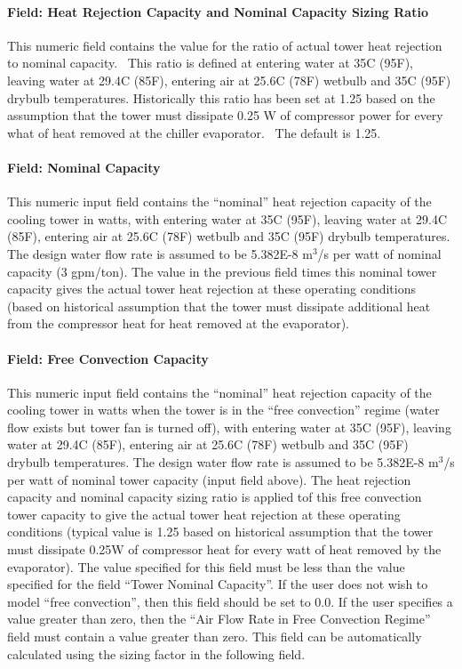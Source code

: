 \paragraph{Field: Heat Rejection Capacity and Nominal Capacity Sizing Ratio}\label{field-heat-rejection-capacity-and-nominal-capacity-sizing-ratio}

This numeric field contains the value for the ratio of actual tower heat rejection to nominal capacity.~ This ratio is defined at entering water at 35C (95F), leaving water at 29.4C (85F), entering air at 25.6C (78F) wetbulb and 35C (95F) drybulb temperatures. Historically this ratio has been set at 1.25 based on the assumption that the tower must dissipate 0.25 W of compressor power for every what of heat removed at the chiller evaporator.~ The default is 1.25.

\paragraph{Field: Nominal Capacity}\label{field-nominal-capacity}

This numeric input field contains the ``nominal'' heat rejection capacity of the cooling tower in watts, with entering water at 35C (95F), leaving water at 29.4C (85F), entering air at 25.6C (78F) wetbulb and 35C (95F) drybulb temperatures. The design water flow rate is assumed to be 5.382E-8 m\(^{3}\)/s per watt of nominal capacity (3 gpm/ton). The value in the previous field times this nominal tower capacity gives the actual tower heat rejection at these operating conditions (based on historical assumption that the tower must dissipate additional heat from the compressor heat for heat removed at the evaporator).

\paragraph{Field: Free Convection Capacity}\label{field-free-convection-capacity}

This numeric input field contains the ``nominal'' heat rejection capacity of the cooling tower in watts when the tower is in the ``free convection'' regime (water flow exists but tower fan is turned off), with entering water at 35C (95F), leaving water at 29.4C (85F), entering air at 25.6C (78F) wetbulb and 35C (95F) drybulb temperatures. The design water flow rate is assumed to be 5.382E-8 m\(^{3}\)/s per watt of nominal tower capacity (input field above). The heat rejection capacity and nominal capacity sizing ratio is applied tof this free convection tower capacity to give the actual tower heat rejection at these operating conditions (typical value is 1.25 based on historical assumption that the tower must dissipate 0.25W of compressor heat for every watt of heat removed by the evaporator). The value specified for this field must be less than the value specified for the field ``Tower Nominal Capacity''. If the user does not wish to model ``free convection'', then this field should be set to 0.0. If the user specifies a value greater than zero, then the ``Air Flow Rate in Free Convection Regime'' field must contain a value greater than zero. This field can be automatically calculated using the sizing factor in the following field.

